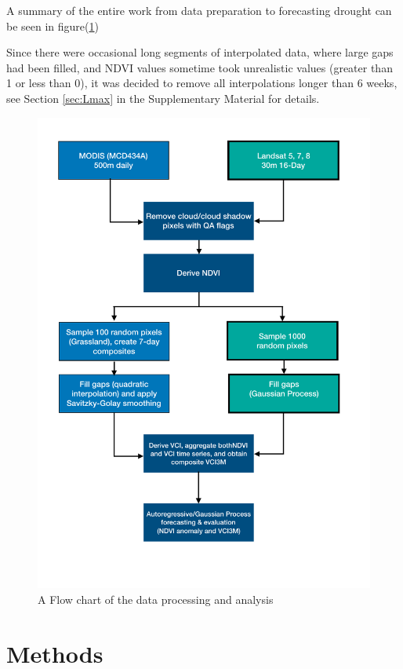 \documentclass[review]{elsarticle}
\begin{document}
 A summary of the entire work from data preparation to forecasting drought can be seen in figure(\ref{fig:flowchart})
 

Since there were occasional long segments of interpolated data, where large gaps had been filled, and NDVI values sometime took unrealistic values (greater than 1 or less than 0), it was decided to remove all interpolations longer than 6 weeks, see Section \ref{sec:Lmax} in the Supplementary Material for details. 

\newpage

\begin{figure} 
	\centering
	\includegraphics[trim = 10mm 0mm 0mm 0mm,width=13 cm]{figures/Flowchart.pdf}
	\caption{A Flow chart of the data processing and analysis } \label{fig:flowchart}
\end{figure}

\section{Methods}
\end{document}
